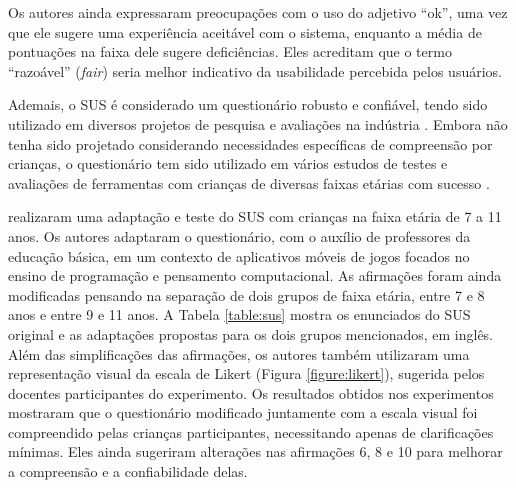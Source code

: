 Os autores ainda expressaram preocupações com o uso do adjetivo \enquote{ok}, uma vez que ele sugere uma experiência aceitável com o sistema, enquanto a média de pontuações na faixa dele sugere deficiências. Eles acreditam que o termo \enquote{razoável} (\textit{fair}) seria melhor indicativo da usabilidade percebida pelos usuários.

Ademais, o SUS é considerado um questionário robusto e confiável, tendo sido utilizado em diversos projetos de pesquisa e avaliações na indústria \citep{brooke1996sus}. Embora não tenha sido projetado considerando necessidades específicas de compreensão por crianças, o questionário tem sido utilizado em vários estudos de testes e avaliações de ferramentas com crianças de diversas faixas etárias com sucesso \citep[i.e.][]{wronska2015ipad, dexheimer2017usability, sanchez2020usability, tasfia2023evaluating}. 

\citet{putnam2020adaptation} realizaram uma adaptação e teste do SUS com crianças na faixa etária de 7 a 11 anos. Os autores adaptaram o questionário, com o auxílio de professores da educação básica, em um contexto de aplicativos móveis de jogos focados no ensino de programação e pensamento computacional. As afirmações foram ainda modificadas pensando na separação de dois grupos de faixa etária, entre 7 e 8 anos e entre 9 e 11 anos. A Tabela \ref{table:sus} mostra os enunciados do SUS original e as adaptações propostas para os dois grupos mencionados, em inglês.  
Além das simplificações das afirmações, os autores também utilizaram uma representação visual da escala de Likert (Figura \ref{figure:likert}), sugerida pelos docentes participantes do experimento.
Os resultados obtidos nos experimentos mostraram que o questionário modificado juntamente com a escala visual foi compreendido pelas crianças participantes, necessitando apenas de clarificações mínimas. Eles ainda sugeriram alterações nas afirmações 6, 8 e 10 para melhorar a compreensão e a confiabilidade delas.



